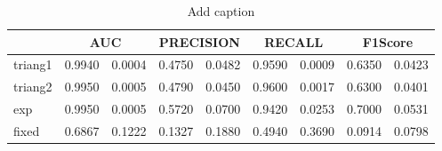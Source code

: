 \begin{table}[htbp]
  \centering
  \caption{Add caption}
    \begin{tabular}{|p{2.945em}|c|c|c|c|c|c|c|c|}
    \toprule
    \rowcolor[rgb]{ .718,  .871,  .91} \multicolumn{1}{|l|}{Policy} & \multicolumn{2}{c|}{AUC} & \multicolumn{2}{c|}{PRECISION} & \multicolumn{2}{c|}{RECALL} & \multicolumn{2}{c|}{F1Score} \\
    \midrule
    \rowcolor[rgb]{ .847,  .894,  .737} triang1 & 0.9940 & 0.0004 & 0.4750 & 0.0482 & 0.9590 & 0.0009 & 0.6350 & 0.0423 \\
    \midrule
    \rowcolor[rgb]{ .847,  .894,  .737} triang2 & 0.9950 & 0.0005 & 0.4790 & 0.0450 & 0.9600 & 0.0017 & 0.6300 & 0.0401 \\
    \midrule
    \rowcolor[rgb]{ .847,  .894,  .737} exp   & 0.9950 & 0.0005 & 0.5720 & 0.0700 & 0.9420 & 0.0253 & 0.7000 & 0.0531 \\
    \midrule
    \rowcolor[rgb]{ .847,  .894,  .737} fixed & 0.6867 & 0.1222 & 0.1327 & 0.1880 & 0.4940 & 0.3690 & 0.0914 & 0.0798 \\
    \bottomrule
    \end{tabular}%
  \label{tab:addlabel}%
\end{table}%
